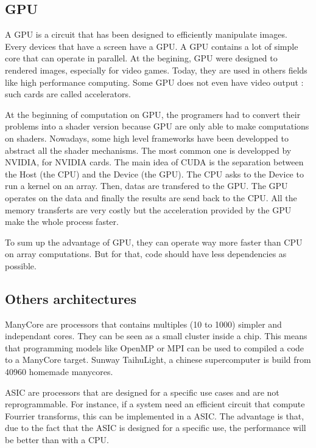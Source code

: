 \subsection{GPU}
A \ac{GPU} is a circuit that has been designed to efficiently manipulate images. Every devices that have a screen have a \ac{GPU}. A \ac{GPU} contains a lot of simple core that can operate in parallel. At the begining, \ac{GPU} were designed to rendered images, especially for video games. Today, they are used in others fields like high performance computing. Some \ac{GPU} does not even have video output : such cards are called accelerators.

At the beginning of computation on \ac{GPU}, the programers had to convert their problems into a shader version because \ac{GPU} are only able to make computations on shaders. Nowadays, some high level frameworks have been developped to abstract all the shader mechanisms. The most common one is  developped by NVIDIA, for NVIDIA cards. The main idea of CUDA is the separation between the Host (the \ac{CPU}) and the Device (the \ac{GPU}). The \ac{CPU} asks to the Device to run a kernel on an array. Then, datas are transfered to the \ac{GPU}. The \ac{GPU} operates on the data and finally the results are send back to the \ac{CPU}. All the memory transferts are very costly but the acceleration provided by the \ac{GPU} make the whole process faster. 

To sum up the advantage of \ac{GPU}, they can operate way more faster than \ac{CPU} on array computations. But for that, code should have less dependencies as possible.

\subsection{Others architectures}
ManyCore are processors that contains multiples (10 to 1000) simpler and independant cores. They can be seen as a small cluster inside a chip. This means that programming models like OpenMP or \ac{MPI} can be used to compiled a code to a ManyCore target. Sunway TaihuLight, a chinese supercomputer is build from 40960 homemade manycores.

\ac{ASIC} are processors that are designed for a specific use cases and are not reprogrammable. For instance, if a system need an efficient circuit that compute Fourrier transforms, this can be implemented in a \ac{ASIC}. The advantage is that, due to the fact that the \ac{ASIC} is designed for a specific use, the performance will be better than with a \ac{CPU}.

